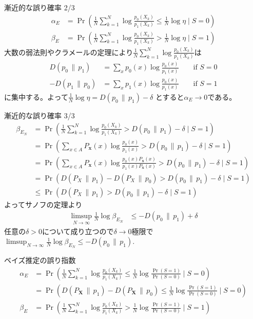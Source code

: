 \documentclass[lualatex,handout]{beamer}
\newcommand\KL[2]{D\left(#1\,\|\,#2\right)}
\theoremstyle{definition}
\begin{document}
\begin{frame}{漸近的な誤り確率 2/3}
\small
\begin{align*}
\alpha_E &= \Pr\left(\frac1N\sum_{k=1}^N\log \frac{p_0(X_k)}{p_1(X_k)} \le \frac1N\log\eta\mid S = 0\right)\\
\beta_E &= \Pr\left(\frac1N\sum_{k=1}^N\log \frac{p_0(X_k)}{p_1(X_k)} > \frac1N\log\eta\mid S = 1\right)
\end{align*}
大数の弱法則やクラメールの定理により$\frac1N\sum_{k=1}^N\log \frac{p_0(X_k)}{p_1(X_k)}$は
\begin{align*}
\KL{p_0}{p_1} &= \sum_{x} p_0(x) \log\frac{p_0(x)}{p_1(x)}\qquad\text{if } S = 0\\
-\KL{p_1}{p_0} &= \sum_{x} p_1(x) \log\frac{p_0(x)}{p_1(x)}\qquad\text{if } S = 1
\end{align*}
に集中する。よって$\frac1N\log\eta = \KL{p_0}{p_1} - \delta$ とすると$\alpha_E\to 0$である。
\end{frame}

\begin{frame}{漸近的な誤り確率 3/3}
\small
\begin{align*}
\beta_{E_N} &= \Pr\left(\frac1N\sum_{k=1}^N\log \frac{p_0(X_k)}{p_1(X_k)} > \KL{p_0}{p_1}-\delta \mid S = 1\right)\\
 &= \Pr\left(\sum_{x\in A}P_{\symbf{x}}(x)\log \frac{p_0(x)}{p_1(x)} > \KL{p_0}{p_1}-\delta \mid S = 1\right)\\
 &= \Pr\left(\sum_{x\in A}P_{\symbf{x}}(x)\log \frac{p_0(x)P_{\symbf{x}}(x)}{p_1(x)P_{\symbf{x}}(x)} > \KL{p_0}{p_1}-\delta \mid S = 1\right)\\
&= \Pr\left(\KL{P_X}{p_1} - \KL{P_X}{p_0} > \KL{p_0}{p_1}-\delta \mid S = 1\right)\\
&\le \Pr\left(\KL{P_X}{p_1} > \KL{p_0}{p_1}-\delta \mid S = 1\right)
\end{align*}
よってサノフの定理より
\begin{align*}
\limsup_{N\to\infty} \frac1N \log\beta_{E_N} &\le -\KL{p_0}{p_1}+\delta
\end{align*}
任意の$\delta>0$について成り立つので$\delta\to0$極限で
$\limsup_{N\to\infty} \frac1N \log\beta_{E_N} \le -\KL{p_0}{p_1}$.
\end{frame}

\begin{frame}{ベイズ推定の誤り指数}
\begin{align*}
\alpha_E &= \Pr\left(\frac1N\sum_{k=1}^N\log \frac{p_0(X_k)}{p_1(X_k)} \le \frac1N\log\frac{\Pr(S=1)}{\Pr(S=0)}\mid S = 0\right)\\
&= \Pr\left(\KL{P_{\symbf{X}}}{p_1} - \KL{P_{\symbf{X}}}{p_0} \le \frac1N\log\frac{\Pr(S=1)}{\Pr(S=0)}\mid S = 0\right)\\
\beta_E &= \Pr\left(\frac1N\sum_{k=1}^N\log \frac{p_0(X_k)}{p_1(X_k)} > \frac1N\log\frac{\Pr(S=1)}{\Pr(S=0)}\mid S = 1\right)
\end{align*}
\end{frame}
\end{document}
